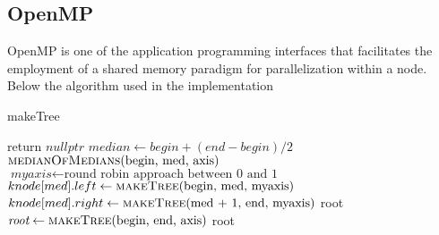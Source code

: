 \documentclass[11pt,a4paper]{article}
\begin{document}
\subsection{OpenMP}
OpenMP is one of the application programming interfaces that facilitates the employment of a shared memory paradigm for parallelization within a node. Below the algorithm used in the implementation
\begin{algorithm}[H]
\caption{makeTree}
\begin{algorithmic}[1]
\State return $\textit{nullptr}$
\EndIf
\State $\textit{median} \gets begin + (end - begin) / 2$
\State $\Call{medianOfMedians}{$begin, med, axis$}$
\State $\textit{myaxis} \gets \text{round robin approach between 0 and 1}$
\color{blue}
\color{black}
\State $knode[med].left \gets \Call{makeTree}{$begin, med, myaxis$}$
\color{blue}
\color{black}
\State $knode[med].right \gets \Call{makeTree}{$med + 1, end, myaxis$}$
\State \Return {}
\EndFunction
\Statex
{}
\State root
\color{blue}
\color{black}
\State $\textit{root} \gets \Call{makeTree}{$begin, end, axis$}$
\State \Return root
\EndFunction
\end{algorithmic}
\end{algorithm}
\end{document}
